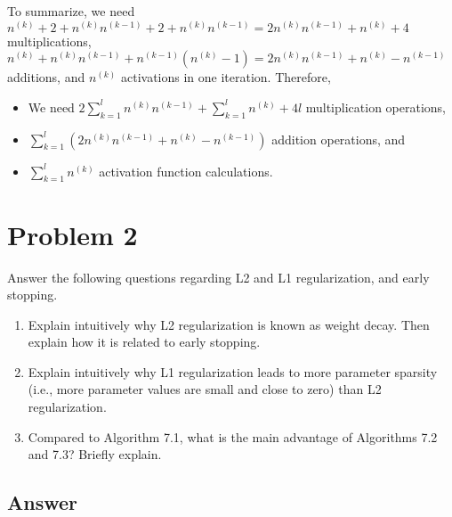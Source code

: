 \documentclass[
	12pt, %
]{../Template/fphw}
\begin{document}
\begin{enumerate}[label=(\arabic*)]
\begin{itemize}
\end{itemize}
To summarize, we need $n^{(k)} + 2+n^{(k)}n^{(k-1)}+2+n^{(k)}n^{(k-1)}= 2n^{(k)}n^{(k-1)}+n^{(k)}+4$ multiplications, $n^{(k)}+n^{(k)}n^{(k-1)}+n^{(k-1)}(n^{(k)}-1) = 2n^{(k)}n^{(k-1)}+n^{(k)}-n^{(k-1)}$ additions, and $n^{(k)}$ activations in one iteration. Therefore,
\begin{itemize}
\item We need $2\sum_{k=1}^{l}n^{(k)}n^{(k-1)} +\sum_{k=1}^{l}n^{(k)} +4l$ multiplication operations,
\item $\sum_{k=1}^{l}\left(2n^{(k)}n^{(k-1)}+n^{(k)}-n^{(k-1)}\right)$ addition operations, and
\item $\sum_{k=1}^{l}n^{(k)}$ activation function calculations.
\end{itemize}

\end{enumerate}


\section*{Problem 2}

\begin{problem}
     Answer the following questions regarding L2 and L1 regularization, and early stopping.
     \begin{enumerate}[label = (\arabic*)]
        \item Explain intuitively why L2 regularization is known as weight decay. Then explain how it is related to early
        stopping.
        \item Explain intuitively why L1 regularization leads to more parameter sparsity (i.e., more parameter values are small
        and close to zero) than L2 regularization.
        \item Compared to Algorithm 7.1, what is the main advantage of Algorithms 7.2 and 7.3? Briefly explain.
    \end{enumerate}
\end{problem}


\subsection*{Answer}
\end{document}

